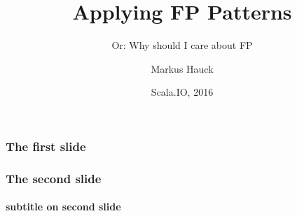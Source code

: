 \documentclass{beamer}
\title{Applying FP Patterns}
\subtitle{Or: Why should I care about FP}
\author{Markus Hauck}
\date{Scala.IO, 2016}
\begin{document}
  \frame{\titlepage}
  \begin{frame}
    \frametitle{The first slide}
  \end{frame}
  \begin{frame}
    \frametitle{The second slide}
    \framesubtitle{subtitle on second slide}
  \end{frame}
\end{document}
